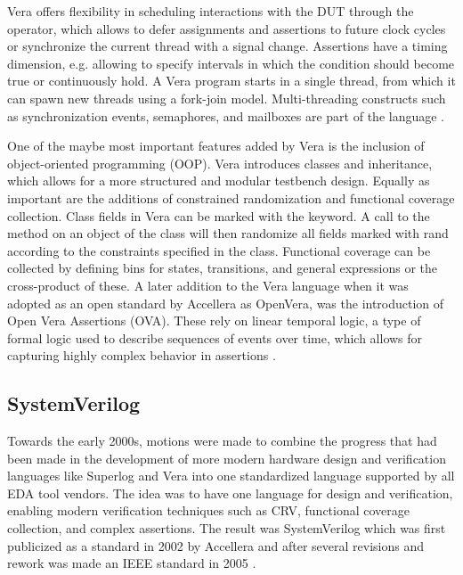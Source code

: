 Vera offers flexibility in scheduling interactions with the DUT through the  operator, which allows to defer
assignments and assertions to future clock cycles or synchronize the current thread with a signal change. Assertions
have a timing dimension, e.g. allowing to specify intervals in which the condition should become true or continuously
hold. A Vera program starts in a single thread, from which it can spawn new threads using a fork-join model.
Multi-threading constructs such as synchronization events, semaphores, and mailboxes are part of the language
\cite{flake2020a}.

One of the maybe most important features added by Vera is the inclusion of object-oriented programming (OOP). Vera
introduces classes and inheritance, which allows for a more structured and modular testbench design. Equally as
important are the additions of constrained randomization and functional coverage collection. Class fields in Vera can
be marked with the  keyword. A call to the  method on an object of the class will then randomize
all fields marked with rand according to the constraints specified in the class. Functional coverage can be collected
by defining bins for states, transitions, and general expressions or the cross-product of these. A later addition to
the Vera language when it was adopted as an open standard by Accellera as OpenVera, was the introduction of Open Vera
Assertions (OVA). These rely on linear temporal logic, a type of formal logic used to describe sequences of events
over time, which allows for capturing highly complex behavior in assertions \cite{flake2020a}.

\subsection{SystemVerilog} %

Towards the early 2000s, motions were made to combine the progress that had been made in the development of more
modern hardware design and verification languages like Superlog and Vera into one standardized language supported by all EDA tool vendors. The idea was
to have one language for design and verification, enabling modern verification techniques such as CRV, functional
coverage collection, and complex assertions. The result was SystemVerilog which was first publicized as a standard in
2002 by Accellera and after several revisions and rework was made an IEEE standard in 2005 \cite{flake2020a}.

